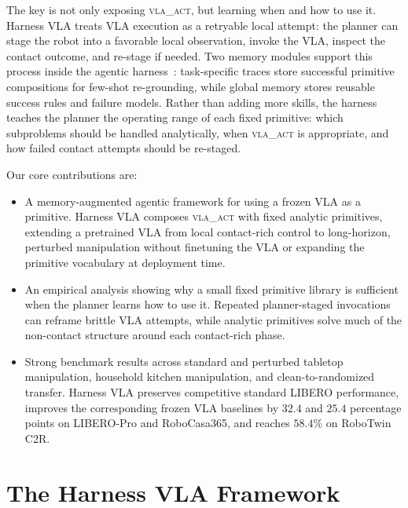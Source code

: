 \documentclass{article}
\begin{document}
    The key is not only exposing \textsc{vla\_act}, but learning when and how to use it. Harness VLA treats VLA execution as a retryable local attempt: the planner can stage the robot into a favorable local observation, invoke the VLA, inspect the contact outcome, and re-stage if needed. Two memory modules support this process inside the agentic harness~\citep{wang2024codeact, yang2024sweagent, wang2023voyager}: task-specific traces store successful primitive compositions for few-shot re-grounding, while global memory stores reusable success rules and failure models. Rather than adding more skills, the harness teaches the planner the operating range of each fixed primitive: which subproblems should be handled analytically, when \textsc{vla\_act} is appropriate, and how failed contact attempts should be re-staged.

Our core contributions are:
    \begin{itemize}
        \item A memory-augmented agentic framework for using a frozen VLA as a primitive. Harness VLA composes \textsc{vla\_act} with fixed analytic primitives, extending a pretrained VLA from local contact-rich control to long-horizon, perturbed manipulation without finetuning the VLA or expanding the primitive vocabulary at deployment time.
        \item An empirical analysis showing why a small fixed primitive library is sufficient when the planner learns how to use it. Repeated planner-staged invocations can reframe brittle VLA attempts, while analytic primitives solve much of the non-contact structure around each contact-rich phase.
        \item Strong benchmark results across standard and perturbed tabletop manipulation, household kitchen manipulation, and clean-to-randomized transfer. Harness VLA preserves competitive standard LIBERO performance, improves the corresponding frozen VLA baselines by $32.4$ and $25.4$ percentage points on LIBERO-Pro and RoboCasa365, and reaches $58.4\%$ on RoboTwin C2R.
    \end{itemize}



\section{The Harness VLA Framework}
\label{sec:method}
\end{document}
